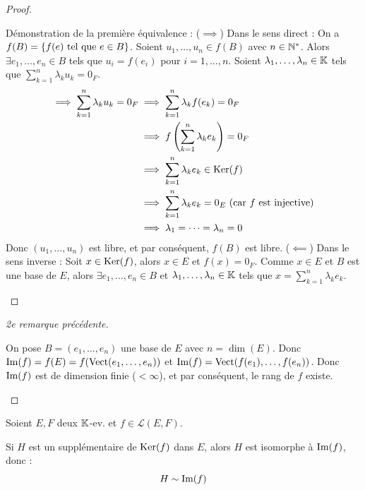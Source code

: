\documentclass[12pt,a4paper]{report}
\begin{document}
\begin{proof}
    \begin{outline}
        \1 Démonstration de la première équivalence :
        \2 ($\implies$) Dans le sens direct :
        \3 On a $f(B) = \{f(e) \text{ tel que } e \in B\}$.
        \3 Soient $u_1,\dots,u_n \in f(B)$ avec $n \in \mathbb{N}^*$. Alors $\exists e_1,\dots,e_n \in B$ tels que $u_i = f(e_i)$ pour $i=1,\dots,n$.
        \3 Soient $\lambda_1,\dots,\lambda_n \in \mathbb{K}$ tels que $\sum_{k=1}^{n}\lambda_k u_k = 0_F$.
        \begin{align*}
            \implies \sum_{k=1}^{n}\lambda_k u_k = 0_F &\implies \sum_{k=1}^{n}\lambda_k f(e_k) = 0_F\\
            &\implies f\left(\sum_{k=1}^{n}\lambda_k e_k\right) = 0_F\\
            &\implies \sum_{k=1}^{n}\lambda_k e_k \in \mathrm{Ker}(f)\\
            &\implies \sum_{k=1}^{n}\lambda_k e_k = 0_E \text{ (car $f$ est injective)}\\
            &\implies \lambda_1 = \dots = \lambda_n = 0
        \end{align*}
        \3 Donc $(u_1,\dots,u_n)$ est libre, et par conséquent, $f(B)$ est libre.
        \2 ($\impliedby$) Dans le sens inverse :
        \3 Soit $x \in \mathrm{Ker}(f)$, alors $x\in E$ et $f(x) = 0_F$.
        \3 Comme $x \in E$ et $B$ est une base de $E$, alors $\exists e_1,\dots,e_n \in B$ et $\lambda_1,\dots,\lambda_n \in \mathbb{K}$ tels que $x = \sum_{k=1}^{n}\lambda_k e_k$.
    \end{outline}
\end{proof}

\begin{proof}[2e remarque précédente]
    \begin{outline}
        \1 On pose $B = (e_1,\dots,e_n)$ une base de $E$ avec $n = \dim(E)$.
        \1 Donc $\mathrm{Im}(f) = f(E) = f(\mathrm{Vect}(e_1,\dots,e_n))$ et $\mathrm{Im}(f) = \mathrm{Vect}(f(e_1),\dots,f(e_n))$.
        \1 Donc $\mathrm{Im}(f)$ est de dimension finie ($< \infty$), et par conséquent, le rang de $f$ existe.
    \end{outline}
\end{proof}

\begin{property}
    Soient $E,F$ deux $\mathbb{K}$-ev. et $f \in \mathcal L(E,F)$.

    Si $H$ est un supplémentaire de $\mathrm{Ker}(f)$ dans $E$, alors $H$ est isomorphe à $\mathrm{Im}(f)$, donc :
    $$H \sim \mathrm{Im}(f)$$
\end{property}
\end{document}
